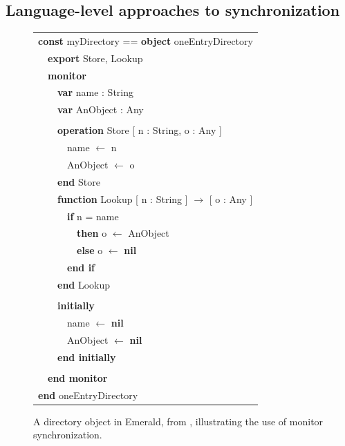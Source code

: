 \subsection{Language-level approaches to synchronization}
\begin{figure}
{\samepage\it\sis%
\begin{tabular}{l}%
{\bf const} myDirectory == {\bf object} oneEntryDirectory\\
~~{\bf export} Store, Lookup\\
~~{\bf monitor}\\
~~~~{\bf var} name : String\\
~~~~{\bf var} AnObject : Any\\
\\
~~~~{\bf operation} Store [ n : String, o : Any ]\\
~~~~~~name $\gets$ n\\
~~~~~~AnObject $\gets$ o\\
~~~~{\bf end} Store
\\
~~~~{\bf function} Lookup [ n : String ] $\to$ [ o : Any ]\\
~~~~~~{\bf if} n = name\\
~~~~~~~~{\bf then} o $\gets$ AnObject\\
~~~~~~~~{\bf else} o $\gets$ {\bf nil}\\
~~~~~~{\bf end if}\\
~~~~{\bf end} Lookup\\
\\
~~~~{\bf initially}\\
~~~~~~name $\gets$ {\bf nil}\\
~~~~~~AnObject $\gets$ {\bf nil}\\
~~~~{\bf end initially}\\
\\
~~{\bf end monitor}\\
{\bf end} oneEntryDirectory
\end{tabular}
}
\caption{A directory object in Emerald, from \cite{BlackHuJuLe86},
  illustrating the use of monitor synchronization.}
\label{fig:emerald-dir}
\end{figure}

